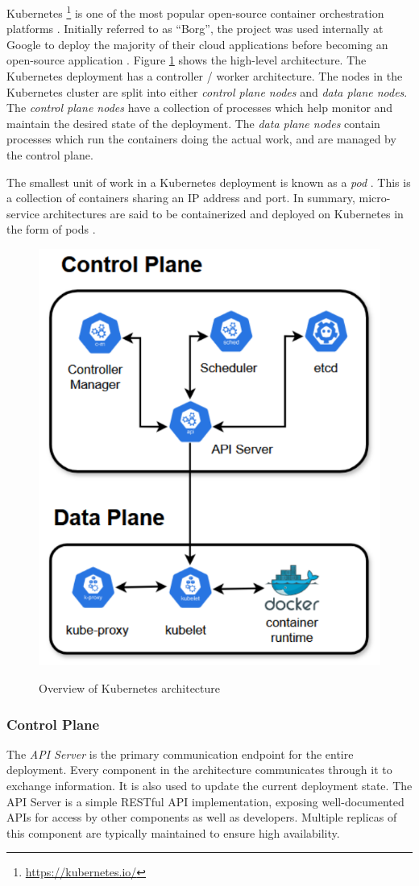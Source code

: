 Kubernetes \footnote{\url{https://kubernetes.io/}} is one of the most popular open-source container orchestration platforms \cite{vayghan2019kubernetes}. Initially referred to as ``Borg'', the project was used internally at Google to deploy the majority of their cloud applications before becoming an open-source application \cite{burns2016borg}. Figure \ref{fig:k8s-arch} shows the high-level architecture. The Kubernetes deployment has a controller / worker architecture. The nodes in the Kubernetes cluster are split into either \textit{control plane nodes} and \textit{data plane nodes}. The \textit{control plane nodes} have a collection of processes which help monitor and maintain the desired state of the deployment. The \textit{data plane nodes} contain processes which run the containers doing the actual work, and are managed by the control plane.\par
The smallest unit of work in a Kubernetes deployment is known as a \textit{pod} \cite{baier2017getting}. This is a collection of containers sharing an IP address and port. In summary, micro-service architectures are said to be containerized and deployed on Kubernetes in the form of pods \cite{vayghan2019kubernetes}.\par
\begin{figure}[htb]
    \centering
    \caption{Overview of Kubernetes architecture}
    \includegraphics[width=0.5\linewidth]{Figures/K8s-Architecture.pdf}
    \label{fig:k8s-arch}
\end{figure}

\subsubsection{Control Plane}
\label{subsubsec:ch2-k8s-control-plane}
The \textit{API Server} is the primary communication endpoint for the entire deployment. Every component in the architecture communicates through it to exchange information. It is also used to update the current deployment state. The API Server is a simple RESTful API implementation, exposing well-documented APIs for access by other components as well as developers. Multiple replicas of this component are typically maintained to ensure high availability.\par

